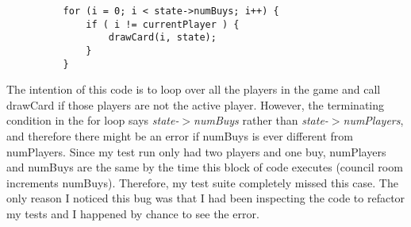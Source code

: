 \documentclass[11pt,letterpaper]{article}
\begin{document}
\begin{enumerate}[label=\Roman*.]
\begin{enumerate}[label=]
        \begin{lstlisting}
          for (i = 0; i < state->numBuys; i++) {
              if ( i != currentPlayer ) {
                  drawCard(i, state);
              }
          }
        \end{lstlisting}

        The intention of this code is to loop over all the players in the
        game and call drawCard if those players are not the active player.
        However, the terminating condition in the for loop says 
        \emph{state-$>$numBuys} rather than \emph{state-$>$numPlayers}, and
        therefore there might be an error if numBuys is ever different from
        numPlayers. Since my test run only had two players and one buy, 
        numPlayers and numBuys are the same by the time this block of code
        executes (council room increments numBuys). Therefore, my test
        suite completely missed this case. The only reason I noticed this
        bug was that I had been inspecting the code to refactor my tests
        and I happened by chance to see the error. 

    \end{enumerate}
\end{enumerate}
\end{document}
